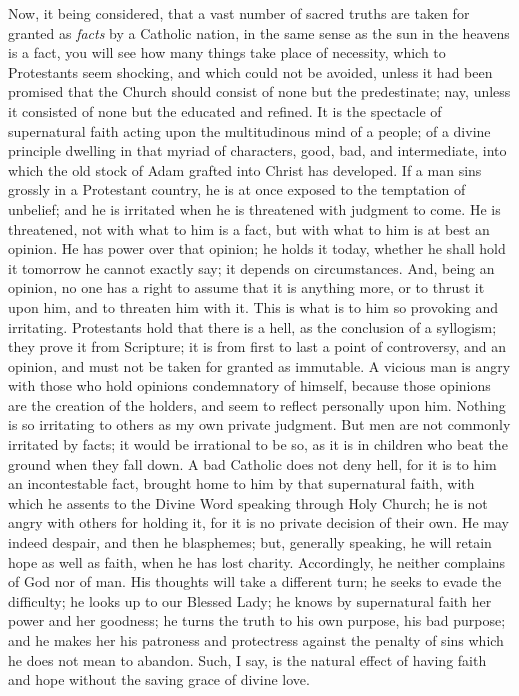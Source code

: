 Now, it being considered, that a vast number of sacred truths are
taken for granted as \emph{facts} by a Catholic nation, in the same
sense as the sun in the heavens is a fact, you will see how many
things take place of necessity, which to Protestants seem shocking,
and which could not be avoided, unless it had been promised that the
Church should consist of none but the predestinate; nay, unless it
consisted of none but the educated and refined. It is the spectacle of
supernatural faith acting upon the multitudinous mind of a people; of
a divine principle dwelling in that myriad of characters, good, bad,
and intermediate, into which the old stock of Adam grafted into Christ
has developed. If a man sins grossly in a Protestant country, he is at
once exposed to the temptation of unbelief; and he is irritated when
he is threatened with judgment to come. He is threatened, not with
what to him is a fact, but with what to him is at best an opinion. He
has power over that opinion; he holds it today, whether he shall hold
it tomorrow he cannot exactly say; it depends on circumstances. And,
being an opinion, no one has a right to assume that it is anything
more, or to thrust it upon him, and to threaten him with it. This is
what is to him so provoking and irritating. Protestants hold that
there is a hell, as the conclusion of a syllogism; they prove it from
Scripture; it is from first to last a point of controversy, and an
opinion, and must not be taken for granted as immutable. A vicious man
is angry with those who hold opinions condemnatory of himself, because
those opinions are the creation of the holders, and seem to reflect
personally upon him. Nothing is so irritating to others as my own
private judgment. But men are not commonly irritated by facts; it
would be irrational to be so, as it is in children who beat the ground
when they fall down. A bad Catholic does not deny hell, for it is to
him an incontestable fact, brought home to him by that supernatural
faith, with which he assents to the Divine Word speaking through Holy
Church; he is not angry with others for holding it, for it is no
private decision of their own. He may indeed despair, and then he
blasphemes; but, generally speaking, he will retain hope as well as
faith, when he has lost charity. Accordingly, he neither complains of
God nor of man. His thoughts will take a different turn; he seeks to
evade the difficulty; he looks up to our Blessed Lady; he knows by
supernatural faith her power and her goodness; he turns the truth to
his own purpose, his bad purpose; and he makes her his patroness and
protectress against the penalty of sins which he does not mean to
abandon. Such, I say, is the natural effect of having faith and hope
without the saving grace of divine love.

